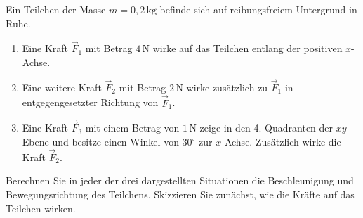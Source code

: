               \begin{MExercises}

               \begin{MExercise}
               Ein Teilchen der Masse $m={0,2}\,\text{kg}$ befinde sich auf reibungsfreiem Untergrund in Ruhe. 
               \begin{enumerate}
               \item Eine Kraft $\vec{F}_1$ mit Betrag $4\,\text{N}$ wirke auf das Teilchen entlang der positiven $x$-Achse.
               \item Eine weitere Kraft  $\vec{F}_2$ mit Betrag $2\,\text{N}$ wirke zus\"atzlich zu $\vec{F}_1$  in entgegengesetzter Richtung von $\vec{F}_1$.
               \item Eine Kraft $\vec{F}_3$ mit einem Betrag von $1\,\text{N}$ zeige in den 4. Quadranten der $xy$-Ebene und besitze einen Winkel von $30^{\circ}$ zur $x$-Achse. Zus\"atzlich wirke die Kraft $\vec{F}_2$.
               \end{enumerate}
               Berechnen Sie in jeder der drei dargestellten Situationen die Beschleunigung und Bewegungsrichtung des Teilchens. Skizzieren Sie zun\"achst, wie die Kr\"afte auf das Teilchen wirken. 
               
               
               \begin{MSolution}
               
               

\end{MSolution}
\end{MExercise}
\end{MExercises}
